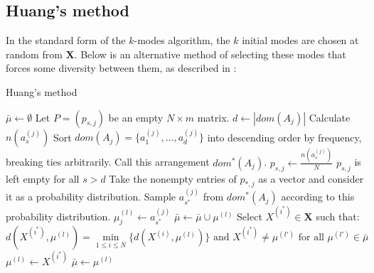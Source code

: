 \documentclass{article}
\theoremstyle{definition}
\begin{document}
\subsection{Huang's method}\label{subsection:huang}

In the standard form of the \(k\)-modes algorithm, the \(k\) initial modes are 
chosen at random from \textbf{X}. Below is an alternative method of selecting
these modes that forces some diversity between them, as described in 
\cite{Huang98}:

\begin{algorithm}[H]
\caption{Huang's method}\label{alg:huang}
    \begin{algorithmic}[0]
        \State \(\bar{\mu} \gets \emptyset\)
        \State Let \(P = (p_{s,j})\) be an empty \(N \times m\) matrix.
            \State \(d \gets |dom(A_j)|\)
                \State Calculate \(n(a_s^{(j)})\)
	        \EndFor
            \State Sort \(dom(A_j) = \{a_1^{(j)}, \ldots, a_d^{(j)}\}\) into 
                descending order by frequency, breaking ties arbitrarily.
            \State Call this arrangement \(dom^*(A_j)\).
                \State \(p_{s,j} \gets \frac{n(a_s^{(j)})}{N}\)
	        \EndFor
            \State \(p_{s,j}\) is left empty for all \(s > d\)
	    \EndFor
                \State Take the nonempty entries of \(p_{*,j}\) as a vector and 
                    consider it as a probability distribution.
            \State Sample \(a_{s^*}^{(j)}\) from \(dom^*(A_j)\) according to 
                this probability distribution.
            \State \(\mu_j^{(l)} \gets a_{s^*}^{(j)}\)
	        \EndFor
            \State \(\bar{\mu} \gets \bar{\mu} \cup \mu^{(l)}\)
	    \EndFor
            \State Select \(X^{(i^*)} \in \textbf{X}\) such that: 
            \[
                d(X^{(i^*)}, \mu^{(l)}) = \min_{1 \le i \le  N} 
                \{d(X^{(i)}, \mu^{(l)})\} \text{ and } X^{(i^*)} \ne \mu^{(l')}
                \text{ for all } \mu^{(l')} \in \bar{\mu}
            \]
            \State \(\mu^{(l)} \gets X^{(i^*)}\)
            \State \(\bar{\mu} \gets \mu^{(l)}\)
	    \EndFor
    \end{algorithmic}
\end{algorithm} 
\end{document}
